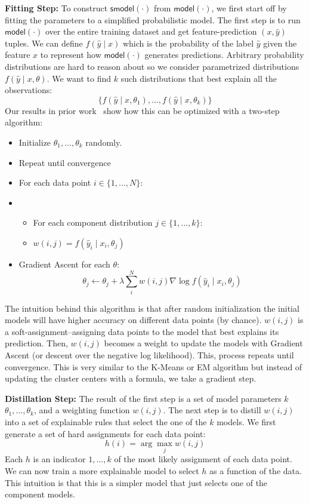 \vspace{0.5em} \noindent \textbf{Fitting Step: } To construct $\textsf{smodel}(\cdot)$ from $\textsf{model}(\cdot)$, we first start off by fitting the parameters to a simplified probabilistic model. 
The first step is to run $\textsf{model}(\cdot)$ over the entire training dataset and get feature-prediction $(x, \hat{y})$ tuples.
We can define $f(\hat{y} \mid x)$ which is the probability of the label $\hat{y}$ given the feature $x$ to represent how $\textsf{model}(\cdot)$ generates predictions. 
Arbitrary probability distributions are hard to reason about so we consider parametrized distributions $f(\hat{y} \mid x, \theta)$. 
We want to find $k$ such distributions that best explain all the observations:
\[
\{f(\hat{y} \mid x, \theta_1),...,f(\hat{y} \mid x, \theta_k)\}
\]
Our results in prior work~\cite{?,Krishnan17} show how this can be optimized with a two-step algorithm:
\begin{itemize}
    \item Initialize $\theta_1,...,\theta_k$ randomly.
    \item Repeat until convergence
    \item For each data point $i \in \{1,...,N\}$: 
    \item \begin{itemize} 
          \item For each component distribution $j \in \{1,...,k\}$:
          \item $w(i,j) = f(\hat{y}_i \mid x_i, \theta_j)$
    \end{itemize}
    \item Gradient Ascent for each $\theta$:
    \[ \theta_j \leftarrow \theta_j + \lambda \sum_i^N w(i,j) \nabla \log f(\hat{y}_i \mid x_i, \theta_j)  \]
\end{itemize}

The intuition behind this algorithm is that after random initialization the initial models will have higher accuracy on different data points (by chance). $w(i,j)$ is a soft-assignment--assigning data points to the model that best explains its prediction. Then, $w(i,j)$ becomes a weight to update the models with Gradient Ascent (or descent over the negative log likelihood). This, process repeats until convergence. This is very similar to the K-Means or EM algorithm but instead of updating the cluster centers with a formula, we take a gradient step.

\vspace{0.5em} \noindent \textbf{Distillation Step: } The result of the first step is a set of model parameters $k$ $\theta_1,...,\theta_k$, and a weighting function $w(i,j)$. The next step is to distill $w(i,j)$ into a set of explainable rules that select the one of the $k$ models. We first generate a set of hard assignments for each data point:
\[
h(i) = \arg\max_{j} w(i,j)
\]
Each $h$ is an indicator $1,...,k$ of the most likely assignment of each data point.
We can now train a more explainable model to select $h$ as a function of the data.
This intuition is that this is a simpler model that just selects one of the component models.

